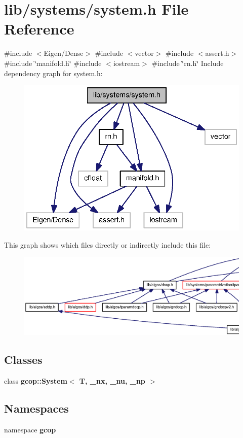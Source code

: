 \section{lib/systems/system.h \-File \-Reference}
\label{system_8h}
{\ttfamily \#include $<$\-Eigen/\-Dense$>$}\*
{\ttfamily \#include $<$vector$>$}\*
{\ttfamily \#include $<$assert.\-h$>$}\*
{\ttfamily \#include \char`\"{}manifold.\-h\char`\"{}}\*
{\ttfamily \#include $<$iostream$>$}\*
{\ttfamily \#include \char`\"{}rn.\-h\char`\"{}}\*
\-Include dependency graph for system.\-h\-:\nopagebreak
\begin{figure}[H]
\begin{center}
\leavevmode
\includegraphics[width=336pt]{system_8h__incl}
\end{center}
\end{figure}
\-This graph shows which files directly or indirectly include this file\-:\nopagebreak
\begin{figure}[H]
\begin{center}
\leavevmode
\includegraphics[width=350pt]{system_8h__dep__incl}
\end{center}
\end{figure}
\subsection*{\-Classes}
\begin{DoxyCompactItemize}
\item 
class {\bf gcop\-::\-System$<$ T, \-\_\-nx, \-\_\-nu, \-\_\-np $>$}
\end{DoxyCompactItemize}
\subsection*{\-Namespaces}
\begin{DoxyCompactItemize}
\item 
namespace {\bf gcop}
\end{DoxyCompactItemize}
